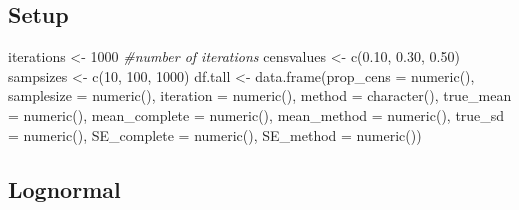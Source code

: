 \documentclass[12pt, twoside]{amherstthesis}
\newenvironment{Shaded}{\begin{snugshade}}{\end{snugshade}}
\newcommand{\AttributeTok}[1]{\textcolor[rgb]{0.77,0.63,0.00}{#1}}
\newcommand{\CommentTok}[1]{\textcolor[rgb]{0.56,0.35,0.01}{\textit{#1}}}
\newcommand{\DecValTok}[1]{\textcolor[rgb]{0.00,0.00,0.81}{#1}}
\newcommand{\FloatTok}[1]{\textcolor[rgb]{0.00,0.00,0.81}{#1}}
\newcommand{\FunctionTok}[1]{\textcolor[rgb]{0.00,0.00,0.00}{#1}}
\newcommand{\NormalTok}[1]{#1}
\newcommand{\OtherTok}[1]{\textcolor[rgb]{0.56,0.35,0.01}{#1}}
\begin{document}
\hypertarget{setup}{%
\subsection{Setup}\label{setup}}
\begin{Shaded}
\begin{Highlighting}[]
\NormalTok{iterations }\OtherTok{\textless{}{-}} \DecValTok{1000} \CommentTok{\#number of iterations}
\NormalTok{censvalues }\OtherTok{\textless{}{-}} \FunctionTok{c}\NormalTok{(}\FloatTok{0.10}\NormalTok{, }\FloatTok{0.30}\NormalTok{, }\FloatTok{0.50}\NormalTok{)}
\NormalTok{sampsizes }\OtherTok{\textless{}{-}} \FunctionTok{c}\NormalTok{(}\DecValTok{10}\NormalTok{, }\DecValTok{100}\NormalTok{, }\DecValTok{1000}\NormalTok{)}
\NormalTok{df.tall }\OtherTok{\textless{}{-}} \FunctionTok{data.frame}\NormalTok{(}\AttributeTok{prop\_cens =} \FunctionTok{numeric}\NormalTok{(),}
                      \AttributeTok{samplesize =} \FunctionTok{numeric}\NormalTok{(),}
                      \AttributeTok{iteration =} \FunctionTok{numeric}\NormalTok{(),}
                      \AttributeTok{method =} \FunctionTok{character}\NormalTok{(),}
                      \AttributeTok{true\_mean =} \FunctionTok{numeric}\NormalTok{(),}
                      \AttributeTok{mean\_complete =} \FunctionTok{numeric}\NormalTok{(),}
                      \AttributeTok{mean\_method =} \FunctionTok{numeric}\NormalTok{(),}
                      \AttributeTok{true\_sd =} \FunctionTok{numeric}\NormalTok{(),}
                      \AttributeTok{SE\_complete =} \FunctionTok{numeric}\NormalTok{(),}
                      \AttributeTok{SE\_method =} \FunctionTok{numeric}\NormalTok{())}
\end{Highlighting}
\end{Shaded}
\hypertarget{lognormal}{%
\subsection{Lognormal}\label{lognormal}}
\end{document}
